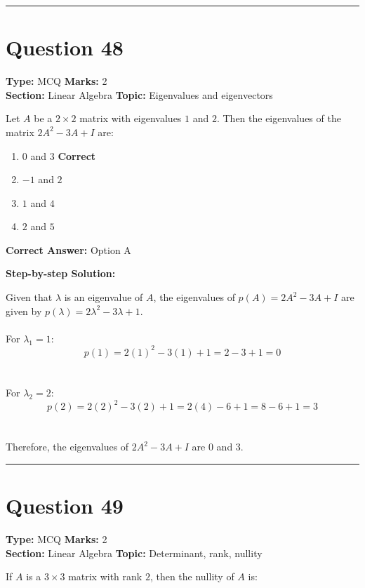 \documentclass[11pt]{article}
\begin{document}
\vspace{0.8em}
\hrule
\vspace{0.4em}
\section*{Question 48}
\textbf{Type:} MCQ \hfill \textbf{Marks:} 2\\
\textbf{Section:} Linear Algebra \hfill \textbf{Topic:} Eigenvalues and eigenvectors

Let \(A\) be a \(2 \times 2\) matrix with eigenvalues \(1\) and \(2\). Then the eigenvalues of the matrix \(2A^2 - 3A + I\) are:


\begin{enumerate}[label=\textbf{\Alph*.}, leftmargin=1.8em]
\item \(0\) and \(3\) \hfill {\color{gategreen}\textbf{Correct}}\item \(-1\) and \(2\)\item \(1\) and \(4\)\item \(2\) and \(5\)\end{enumerate}

\textbf{Correct Answer:} Option A

\textbf{Step-by-step Solution:}

Given that \(\lambda\) is an eigenvalue of \(A\), the eigenvalues of \(p(A) = 2A^2 - 3A + I\) are given by \(p(\lambda) = 2\lambda^2 - 3\lambda + 1\).\\
\\
For \(\lambda_1 = 1\):\\
\[p(1) = 2(1)^2 - 3(1) + 1 = 2 - 3 + 1 = 0\]\\
\\
For \(\lambda_2 = 2\):\\
\[p(2) = 2(2)^2 - 3(2) + 1 = 2(4) - 6 + 1 = 8 - 6 + 1 = 3\]\\
\\
Therefore, the eigenvalues of \(2A^2 - 3A + I\) are \(0\) and \(3\).

\vspace{0.8em}
\hrule
\vspace{0.4em}
\section*{Question 49}
\textbf{Type:} MCQ \hfill \textbf{Marks:} 2\\
\textbf{Section:} Linear Algebra \hfill \textbf{Topic:} Determinant, rank, nullity

If \(A\) is a \(3 \times 3\) matrix with rank \(2\), then the nullity of \(A\) is:
\end{document}

